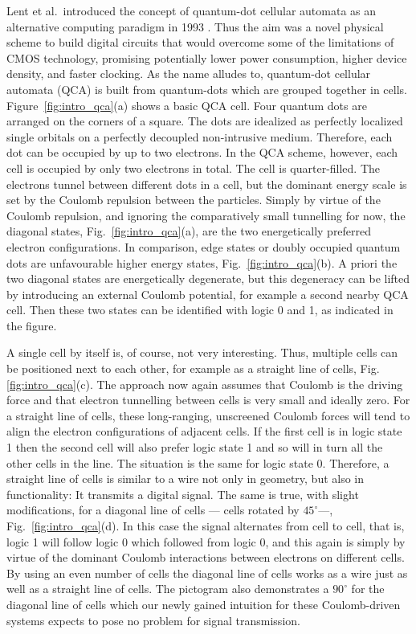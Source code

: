 Lent et al.\ introduced the concept of quantum-dot cellular automata as an
alternative computing paradigm in 1993 \cite{lent1993quantum}. Thus the aim was
a novel physical scheme to build digital circuits that would overcome some of
the limitations of CMOS technology, promising potentially lower power
consumption, higher device density, and faster clocking. As the name alludes to,
quantum-dot cellular automata (QCA) is built from quantum-dots which are grouped
together in cells. Figure~\ref{fig:intro_qca}(a) shows a basic QCA cell. Four
quantum dots are arranged on the corners of a square. The dots are idealized as
perfectly localized single orbitals on a perfectly decoupled non-intrusive
medium. Therefore, each dot can be occupied by up to two electrons. In the QCA
scheme, however, each cell is occupied by only two electrons in total. The cell
is quarter-filled. The electrons tunnel between different dots in a cell, but
the dominant energy scale is set by the Coulomb repulsion between the particles.
Simply by virtue of the Coulomb repulsion, and ignoring the comparatively small
tunnelling for now, the diagonal states, Fig.~\ref{fig:intro_qca}(a), are the
two energetically preferred electron configurations. In comparison, edge states
or doubly occupied quantum dots are unfavourable higher energy states,
Fig.~\ref{fig:intro_qca}(b). A priori the two diagonal states are energetically
degenerate, but this degeneracy can be lifted by introducing an external Coulomb
potential, for example a second nearby QCA cell. Then these two states can be
identified with logic 0 and 1, as indicated in the figure.

A single cell by itself is, of course, not very interesting. Thus, multiple
cells can be positioned next to each other, for example as a straight line of
cells, Fig.\ref{fig:intro_qca}(c). The approach now again assumes that Coulomb
is the driving force and that electron tunnelling between cells is very small
and ideally zero. For a straight line of cells, these long-ranging, unscreened
Coulomb forces will tend to align the electron configurations of adjacent cells.
If the first cell is in logic state 1 then the second cell will also prefer
logic state 1 and so will in turn all the other cells in the line. The situation
is the same for logic state 0. Therefore, a straight line of cells is similar to
a wire not only in geometry, but also in functionality: It transmits a digital
signal. The same is true, with slight modifications, for a diagonal line of
cells --- cells rotated by $45^{\circ}$---, Fig.~\ref{fig:intro_qca}(d). In this
case the signal alternates from cell to cell, that is, logic 1 will follow logic
0 which followed from logic 0, and this again is simply by virtue of the
dominant Coulomb interactions between electrons on different cells. By using an
even number of cells the diagonal line of cells works as a wire just as well as
a straight line of cells. The pictogram also demonstrates a $90^{\circ}$ for the
diagonal line of cells which our newly gained intuition for these Coulomb-driven
systems expects to pose no problem for signal transmission.

